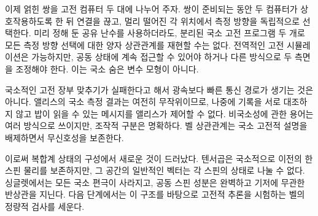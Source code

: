 이제 얽힌 쌍을 고전 컴퓨터 두 대에 나누어 주자. 쌍이 준비되는 동안 두 컴퓨터가 상호작용하도록 한 뒤 연결을 끊고, 멀리 떨어진 각 위치에서 측정 방향을 독립적으로 선택한다. 미리 정해 둔 공유 난수를 사용하더라도, 분리된 국소 고전 프로그램 두 개로 모든 측정 방향 선택에 대한 양자 상관관계를 재현할 수는 없다. 전역적인 고전 시뮬레이션은 가능하지만, 공동 상태에 계속 접근할 수 있어야 하거나 다른 방식으로 두 측면을 조정해야 한다. 이는 국소 숨은 변수 모형이 아니다.

국소적인 고전 장부 맞추기가 실패한다고 해서 광속보다 빠른 통신 경로가 생기는 것은 아니다. 앨리스의 국소 측정 결과는 여전히 무작위이므로, 나중에 기록을 서로 대조하지 않고 밥이 읽을 수 있는 메시지를 앨리스가 제어할 수 없다. 비국소성에 관한 용어는 여러 방식으로 쓰이지만, 조작적 구분은 명확하다. 벨 상관관계는 국소 고전적 설명을 배제하면서 무신호성을 보존한다.

이로써 복합계 상태의 구성에서 새로운 것이 드러났다. 텐서곱은 국소적으로 이전의 한 스핀 물리를 보존하지만, 그 공간의 일반적인 벡터는 각 스핀의 상태로 나눌 수 없다. 싱글렛에서는 모든 국소 편극이 사라지고, 공동 스핀 성분은 완벽하고 기저에 무관한 반상관을 지닌다. 다음 단계에서는 이 구조를 바탕으로 고전적 추론을 시험하는 벨의 정량적 검사를 세운다.
